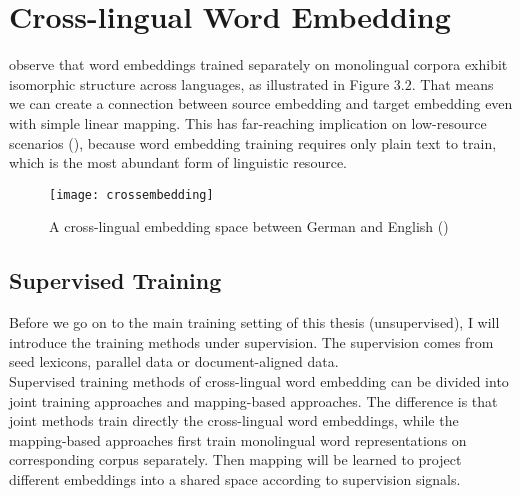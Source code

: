 \section{ Cross-lingual Word Embedding}
  \cite{mikolov2013exploiting}  observe that word embeddings trained separately on monolingual corpora exhibit isomorphic structure across languages, as illustrated in Figure $3.2$. That means we can create a connection between source embedding and target embedding even with simple linear mapping. This has far-reaching implication on low-resource scenarios (\cite{adams2017cross}), because word embedding training requires only plain text to train, which is the most abundant form of linguistic resource.
\begin{figure}[t]
	\texttt{[image: crossembedding]}
	\centering
	\caption{A cross-lingual embedding space between German and English (\cite{ruder2017survey})}
\end{figure}

%
%
%
	

\subsection{Supervised Training}
Before we go on to the main training setting of this thesis (unsupervised), I will introduce the training methods under supervision. The supervision comes from seed lexicons, parallel data or document-aligned data.\\
Supervised training methods of cross-lingual word embedding can be divided into joint training approaches and mapping-based approaches. The difference is that joint methods train directly the cross-lingual word embeddings, while the mapping-based approaches first train monolingual word representations on corresponding corpus separately. Then mapping will be learned to project different embeddings into a shared space according to supervision signals. \\

